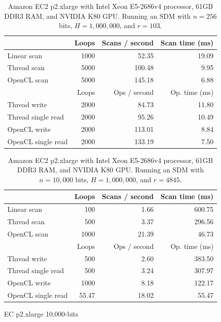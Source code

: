 \begin{table}[!htb]
\centering
\begin{tabular}{| l | r | r | r |}
    \hline
    & Loops & Scans / second & Scan time (ms) \\ \hline
    Linear scan & 1000 & 52.35 & 19.09 \\
    Thread scan & 5000 & 100.48 & 9.95 \\
    OpenCL scan & 5000 & 145.18 & 6.88 \\ \hline
    \hline
    & Loops & Ops / second & Op. time (ms) \\ \hline
    Thread write & 2000 & 84.73 & 11.80 \\
    Thread single read & 2000 & 95.26 & 10.49 \\
    OpenCL write & 2000 & 113.01 & 8.84 \\
    OpenCL single read & 2000 & 133.19 & 7.50 \\
    \hline
\end{tabular}
\caption{Amazon EC2 p2.xlarge with Intel Xeon E5-2686v4 processor, 61GB DDR3 RAM, and NVIDIA K80 GPU. Running an SDM with $n=256$ bits, $H=1,000,000$, and $r=103$.}
\end{table}

\begin{table}[!htb]
\centering
\begin{tabular}{| l | r | r | r |}
    \hline
    & Loops & Scans / second & Scan time (ms) \\ \hline
    Linear scan & 100 & 1.66 & 600.75 \\
    Thread scan & 500 & 3.37 & 296.56 \\
    OpenCL scan & 1000 & 21.39 & 46.73 \\ \hline
    \hline
    & Loops & Ops / second & Op. time (ms) \\ \hline
    Thread write & 500 & 2.60 & 383.50 \\
    Thread single read & 500 & 3.24 & 307.97 \\
    OpenCL write & 1000 & 8.18 & 122.17 \\
    OpenCL single read & 55.47 & 18.02 & 55.47 \\
    \hline
\end{tabular}
\caption{EC p2.xlarge 10,000-bits}
\caption{Amazon EC2 p2.xlarge with Intel Xeon E5-2686v4 processor, 61GB DDR3 RAM, and NVIDIA K80 GPU. Running an SDM with $n=10,000$ bits, $H=1,000,000$, and $r=4845$.}
\end{table}


